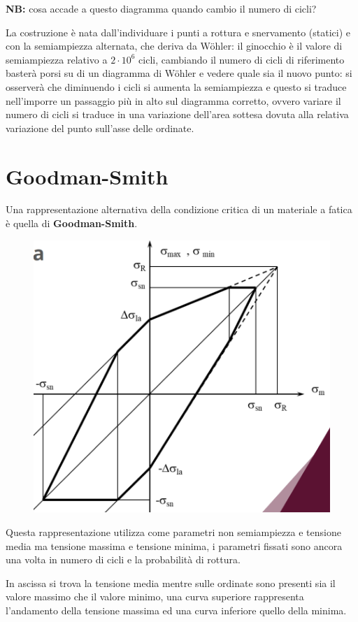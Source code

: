 			\textbf{NB:} cosa accade a questo diagramma quando cambio il numero di cicli? 
			
			La costruzione è nata dall'individuare i punti a rottura e snervamento (statici) e con la semiampiezza alternata, che deriva da Wöhler: il ginocchio è il valore di semiampiezza relativo a $2\cdot10^6$ cicli, cambiando il numero di cicli di riferimento basterà porsi su di un diagramma di Wöhler e vedere quale sia il nuovo punto: si osserverà che diminuendo i cicli si aumenta la semiampiezza e questo si traduce nell'imporre un passaggio più in alto sul diagramma corretto, ovvero variare il numero di cicli si traduce in una variazione dell'area sottesa dovuta alla relativa variazione del punto sull'asse delle ordinate. 
			
\newpage			
\section{Goodman-Smith}
			Una rappresentazione alternativa della condizione critica di un materiale a fatica è quella di \textbf{Goodman-Smith}.
\begin{figure}[H]
	\centering
	\label{fig:screenshot010}
	\includegraphics[width=0.5\linewidth]{immagini_11/screenshot010}
\end{figure}			
			Questa rappresentazione utilizza come parametri non semiampiezza e tensione media ma tensione massima e tensione minima, i parametri fissati sono ancora una volta in numero di cicli e la probabilità di rottura. 
			
			In ascissa si trova la tensione media mentre sulle ordinate sono presenti sia il valore massimo che il valore minimo, una curva superiore rappresenta l'andamento della tensione massima ed una curva inferiore quello della minima. \newline
			
